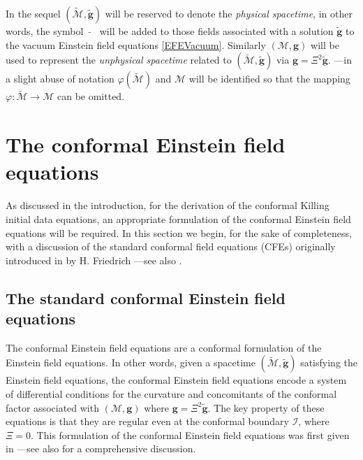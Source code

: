 \documentclass[10pt,a4paper]{article}
\theoremstyle{plain}
\def\bmg{{\bm g}}
\begin{document}
\medskip

In the sequel $(\tilde{\mathcal{M}},\tilde{\bmg})$ will be reserved to
denote the \emph{physical spacetime}, in other words, the symbol
$\tilde{ \quad}$ will be added to those fields associated with a
solution $\tilde{\bmg}$ to the vacuum Einstein field equations
\eqref{EFEVacuum}.  Similarly $(\mathcal{M},\bmg)$ will be used to
represent the \emph{unphysical spacetime} related to
$(\tilde{\mathcal{M}},\tilde{\bmg})$ via $\bmg=\Xi^2\tilde{\bmg}$.
---in a slight abuse of notation $\varphi(\tilde{\mathcal{M}})$ and
$\mathcal{M}$ will be identified so that the mapping $\varphi:
\tilde{\mathcal{M}}\rightarrow\mathcal{M}$ can be omitted.



\section{The  conformal Einstein field equations}
\label{Sec:CFEs}

As discussed in the introduction, for the derivation of the conformal
Killing initial data equations, an appropriate formulation of the
conformal Einstein field equations will be required.  In this section
we begin, for the sake of completeness, with a discussion of the standard
conformal field equations (CFEs) originally introduced in
\cite{Fri81a} by H. Friedrich ---see also \cite{CFEbook}.




\subsection{The standard conformal Einstein field equations}


The conformal Einstein field equations are a conformal formulation of
the Einstein field equations. In other words, given a spacetime
$(\tilde{\mathcal{M}},\tilde{\bmg})$ satisfying the Einstein field
equations, the conformal Einstein field equations encode a system of
differential conditions for the curvature and concomitants of the
conformal factor associated with $(\mathcal{M},\bmg)$ where
$\bmg=\Xi^2\tilde{\bmg}$. The key property of these equations is that
they are regular even at the conformal boundary $\mathscr{I}$, where
$\Xi=0$.  This formulation of the conformal Einstein field equations
was first given in \cite{Fri81a} ---see also \cite{CFEbook} for a
comprehensive discussion.
\end{document}

